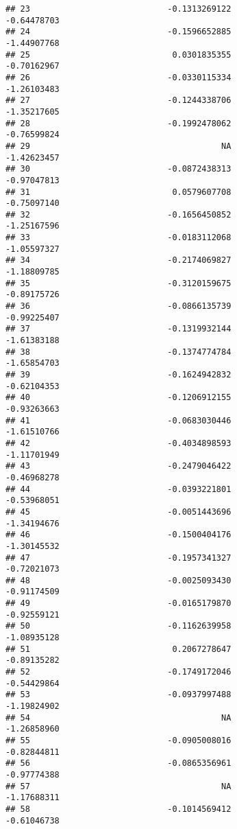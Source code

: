 \documentclass[
]{article}
\begin{document}
\begin{verbatim}
## 23                            -0.1313269122                -0.64478703
## 24                            -0.1596652885                -1.44907768
## 25                             0.0301835355                -0.70162967
## 26                            -0.0330115334                -1.26103483
## 27                            -0.1244338706                -1.35217605
## 28                            -0.1992478062                -0.76599824
## 29                                       NA                -1.42623457
## 30                            -0.0872438313                -0.97047813
## 31                             0.0579607708                -0.75097140
## 32                            -0.1656450852                -1.25167596
## 33                            -0.0183112068                -1.05597327
## 34                            -0.2174069827                -1.18809785
## 35                            -0.3120159675                -0.89175726
## 36                            -0.0866135739                -0.99225407
## 37                            -0.1319932144                -1.61383188
## 38                            -0.1374774784                -1.65854703
## 39                            -0.1624942832                -0.62104353
## 40                            -0.1206912155                -0.93263663
## 41                            -0.0683030446                -1.61510766
## 42                            -0.4034898593                -1.11701949
## 43                            -0.2479046422                -0.46968278
## 44                            -0.0393221801                -0.53968051
## 45                            -0.0051443696                -1.34194676
## 46                            -0.1500404176                -1.30145532
## 47                            -0.1957341327                -0.72021073
## 48                            -0.0025093430                -0.91174509
## 49                            -0.0165179870                -0.92559121
## 50                            -0.1162639958                -1.08935128
## 51                             0.2067278647                -0.89135282
## 52                            -0.1749172046                -0.54429864
## 53                            -0.0937997488                -1.19824902
## 54                                       NA                -1.26858960
## 55                            -0.0905008016                -0.82844811
## 56                            -0.0865356961                -0.97774388
## 57                                       NA                -1.17688311
## 58                            -0.1014569412                -0.61046738

\end{verbatim}
\end{document}
